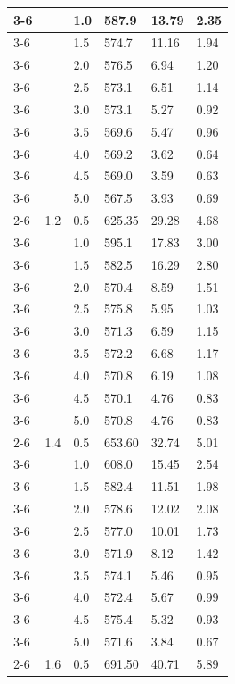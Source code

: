\begin{longtable}{|p{}|p{}|p{}|p{}|p{}|p{}|}
	\cline{3-6}
	& & 1.0 & 587.9 & 13.79 & 2.35 \\
	\cline{3-6}
	& & 1.5 & 574.7 & 11.16 & 1.94 \\
	\cline{3-6}
	& & 2.0 & 576.5 & 6.94 & 1.20 \\
	\cline{3-6}
	& & 2.5 & 573.1 & 6.51 & 1.14 \\
	\cline{3-6}
	& & 3.0 & 573.1 & 5.27 & 0.92 \\
	\cline{3-6}
	& & 3.5 & 569.6 & 5.47 & 0.96 \\
	\cline{3-6}
	& & 4.0 & 569.2 & 3.62 & 0.64 \\
	\cline{3-6}
	& & 4.5 & 569.0 & 3.59 & 0.63 \\
	\cline{3-6}
	& & 5.0 & 567.5 & 3.93 & 0.69 \\
	\cline{2-6}
	& 1.2 & 0.5 & 625.35 & 29.28 & 4.68 \\
	\cline{3-6}
	& & 1.0 & 595.1 & 17.83 & 3.00 \\
	\cline{3-6}
	& & 1.5 & 582.5 & 16.29 & 2.80 \\
	\cline{3-6}
	& & 2.0 & 570.4 & 8.59 & 1.51 \\
	\cline{3-6}
	& & 2.5 & 575.8 & 5.95 & 1.03 \\
	\cline{3-6}
	& & 3.0 & 571.3 & 6.59 & 1.15 \\
	\cline{3-6}
	& & 3.5 & 572.2 & 6.68 & 1.17 \\
	\cline{3-6}
	& & 4.0 & 570.8 & 6.19 & 1.08 \\
	\cline{3-6}
	& & 4.5 & 570.1 & 4.76 & 0.83 \\
	\cline{3-6}
	& & 5.0 & 570.8 & 4.76 & 0.83 \\
	\cline{2-6}
	& 1.4 & 0.5 & 653.60 & 32.74 & 5.01 \\
	\cline{3-6}
	& & 1.0 & 608.0 & 15.45 & 2.54 \\
	\cline{3-6}
	& & 1.5 & 582.4 & 11.51 & 1.98 \\
	\cline{3-6}
	& & 2.0 & 578.6 & 12.02 & 2.08 \\
	\cline{3-6}
	& & 2.5 & 577.0 & 10.01 & 1.73 \\
	\cline{3-6}
	& & 3.0 & 571.9 & 8.12 & 1.42 \\
	\cline{3-6}
	& & 3.5 & 574.1 & 5.46 & 0.95 \\
	\cline{3-6}
	& & 4.0 & 572.4 & 5.67 & 0.99 \\
	\cline{3-6}
	& & 4.5 & 575.4 & 5.32 & 0.93 \\
	\cline{3-6}
	& & 5.0 & 571.6 & 3.84 & 0.67 \\
	\cline{2-6}
	& 1.6 & 0.5 & 691.50 & 40.71 & 5.89 \\

\end{longtable}
